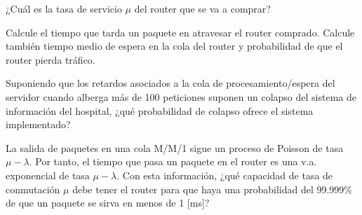 \documentclass{upmassignment}
\begin{document}
\begin{problemlist}
    \pbitem ¿Cuál es la tasa de servicio $\mu$
    del router que se va a comprar?

    \begin{solucion}
        
    \end{solucion}

    \pbitem Calcule el tiempo que tarda
    un paquete en atravesar el router comprado.
    Calcule también tiempo medio de espera
    en la cola del router
    y probabilidad de que el router pierda
    tráfico.


    \begin{solucion}
        
    \end{solucion}

    \pbitem Suponiendo que los retardos asociados a la cola de procesamiento/espera del servidor cuando alberga más de 100 peticiones suponen un colapso del sistema de información del hospital, ¿qué probabilidad de colapso ofrece el sistema implementado?

    \begin{solucion}
        
    \end{solucion}


    \pbitem La salida de paquetes en una cola
    M/M/1 sigue un proceso de Poisson de tasa
    $\mu-\lambda$. Por tanto, el tiempo que
    pasa un paquete en el router es una v.a. exponencial de tasa $\mu-\lambda$. Con esta información, ¿qué capacidad de tasa de conmutación
    $\mu$ debe tener el router para que haya una probabilidad del 99.999\% de que un paquete se sirva en menos de 1 [ms]?

    \begin{solucion}
        
    \end{solucion}
\end{problemlist}
\end{document}
